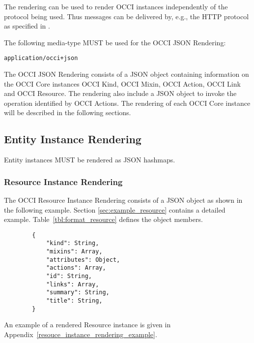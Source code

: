\documentclass[10pt,a4paper]{article}
\begin{document}
The rendering can be used to render OCCI instances independently of the
protocol being used. Thus messages can be delivered by, e.g., the HTTP
protocol as specified in \cite{occi:protocol}.

The following media-type MUST be used for the OCCI JSON Rendering:

{\tt application/occi+json}

The OCCI JSON Rendering consists of a JSON object containing information on the
OCCI Core instances OCCI Kind, OCCI Mixin, OCCI Action,
OCCI Link and OCCI Resource. The rendering also include a JSON object to invoke
the operation identified by OCCI Actions.
The rendering of each OCCI Core instance will be
described in the following sections.

\subsection{Entity Instance Rendering}
\label{sec:format_entity_instance_rendering}

Entity instances MUST be rendered as JSON hashmaps.

\subsubsection{Resource Instance Rendering}
\label{sec:format_resource}

The OCCI Resource Instance Rendering consists of a JSON object as shown in the
following example. Section \ref{sec:example_resource} contains a detailed
example.
Table~\ref{tbl:format_resource} defines the object members.
\begin{lstlisting}
        {
            "kind": String,
            "mixins": Array,
            "attributes": Object,
            "actions": Array,
            "id": String,
            "links": Array,
            "summary": String,
            "title": String,
        }
\end{lstlisting}

An example of a rendered Resource instance is given in Appendix~\ref{resouce_instance_rendering_example}.
\end{document}
